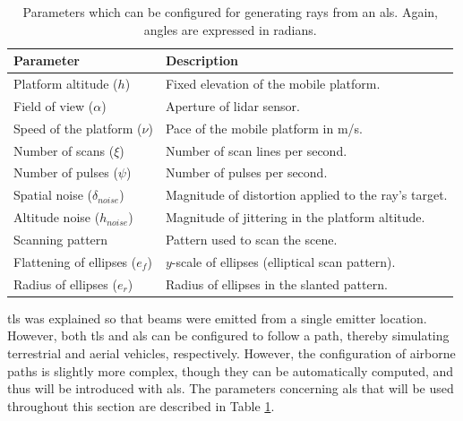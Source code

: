 \renewcommand{\arraystretch}{1.2}
\begin{table}
    \footnotesize
    \caption{Parameters which can be configured for generating rays from an \acrshort{als}. Again, angles are expressed in radians.}
    \label{table:als_parameters}
    \centering
    \begin{tabular}{ll}
    \toprule
    \textbf{Parameter} & \textbf{Description} \\
    \midrule
    Platform altitude ($h$) & Fixed elevation of the mobile platform.\\
    Field of view ($\alpha$) & Aperture of \acrshort{lidar} sensor. \\
    Speed of the platform ($\nu$) & Pace of the mobile platform in \si{\meter/\second}. \\
    Number of scans ($\xi$) & Number of scan lines per second. \\
    Number of pulses ($\psi$) & Number of pulses per second. \\
    Spatial noise ($\delta_{\textit{noise}}$) & Magnitude of distortion applied to the ray's target.\\
    Altitude noise ($h_{\textit{noise}}$) & Magnitude of jittering in the platform altitude.\\
    Scanning pattern & Pattern used to scan the scene. \\
    Flattening of ellipses ($e_{f}$) & $y$-scale of ellipses (elliptical scan pattern). 
    \\
    Radius of ellipses ($e_{r}$) & Radius of ellipses in the slanted pattern.\\
    \bottomrule
    \end{tabular}
\end{table}
\renewcommand{\arraystretch}{1}

\acrshort{tls} was explained so that beams were emitted from a single emitter location. However, both \acrshort{tls} and \acrshort{als} can be configured to follow a path, thereby simulating terrestrial and aerial vehicles, respectively. However, the configuration of airborne paths is slightly more complex, though they can be automatically computed, and thus will be introduced with \acrshort{als}. The parameters concerning \acrshort{als} that will be used throughout this section are described in Table \ref{table:als_parameters}.


